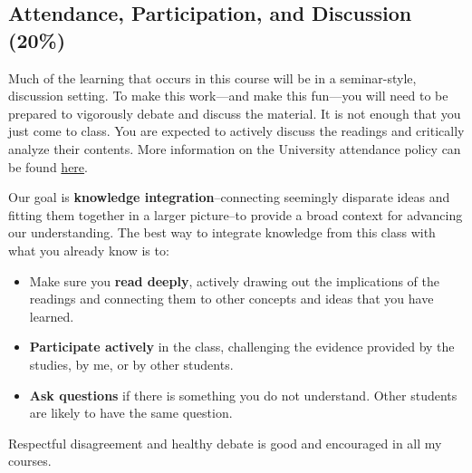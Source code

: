 \documentclass[
  letterpaper,
]{article}
\providecommand{\tightlist}{%
  \setlength{\itemsep}{0pt}\setlength{\parskip}{0pt}}\usepackage{longtable,booktabs,array}
\begin{document}
\hypertarget{attendance-participation-and-discussion-20}{%
\subsection{Attendance, Participation, and Discussion
(20\%)}\label{attendance-participation-and-discussion-20}}

Much of the learning that occurs in this course will be in a
seminar-style, discussion setting. To make this work---and make this
fun---you will need to be prepared to vigorously debate and discuss the
material. It is not enough that you just come to class. You are expected
to actively discuss the readings and critically analyze their contents.
More information on the University attendance policy can be found
\href{https://catalog.utah.edu/pages/8Fjihzb4XouQv5OY0ZiE}{here}.

Our goal is \textbf{knowledge integration}--connecting seemingly
disparate ideas and fitting them together in a larger picture--to
provide a broad context for advancing our understanding. The best way to
integrate knowledge from this class with what you already know is to:

\begin{itemize}
\tightlist
\item
  Make sure you \textbf{read deeply}, actively drawing out the
  implications of the readings and connecting them to other concepts and
  ideas that you have learned.
\item
  \textbf{Participate actively} in the class, challenging the evidence
  provided by the studies, by me, or by other students.
\item
  \textbf{Ask questions} if there is something you do not understand.
  Other students are likely to have the same question.
\end{itemize}

\begin{tcolorbox}[enhanced jigsaw, bottomrule=.15mm, leftrule=.75mm, toptitle=1mm, titlerule=0mm, breakable, toprule=.15mm, opacityback=0, colbacktitle=quarto-callout-note-color!10!white, colback=white, title=\textcolor{quarto-callout-note-color}{\faInfo}\hspace{0.5em}{Note}, bottomtitle=1mm, arc=.35mm, rightrule=.15mm, coltitle=black, colframe=quarto-callout-note-color-frame, left=2mm, opacitybacktitle=0.6]

Respectful disagreement and healthy debate is good and encouraged in all
my courses.

\end{tcolorbox}
\end{document}
